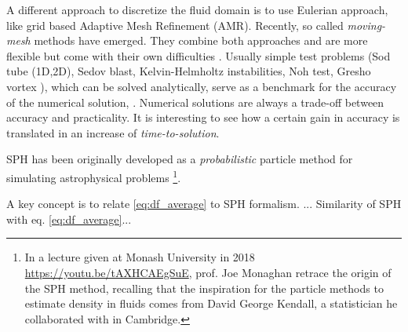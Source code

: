 A different approach to discretize the fluid domain is to use Eulerian approach, like grid based Adaptive Mesh Refinement (AMR).
Recently, so called \emph{moving-mesh} methods have emerged. They combine both approaches and are more flexible but come with their own difficulties \citep{Springel2010, Shadowfax, Arepo}.
Usually simple test problems (Sod tube (1D,2D), Sedov blast, Kelvin-Helmholtz instabilities, Noh test, Gresho vortex \citet{Gresho1990}), %
which can be solved analytically, serve as a benchmark for the accuracy of the numerical solution, \citep[e.g. by measuring the distance of the two solution with an L2-norm in the whole domain, ][]{BorrowSphenix}.
Numerical solutions are always a trade-off between accuracy and practicality.
It is interesting to see how a certain gain in accuracy is translated in an increase of \emph{time-to-solution}.

SPH has been originally developed as a \emph{probabilistic} particle method for simulating astrophysical problems \citep{Lucy1977, Gingold1977}\footnote{In a lecture given at Monash University in 2018 \url{https://youtu.be/tAXHCAEgSuE}, prof. Joe Monaghan retrace the origin of the SPH method, recalling that the inspiration for the particle methods to estimate density in fluids comes from David George Kendall, a statistician he collaborated with in Cambridge.}.

A key concept is to relate \eqref{eq:df_average} to SPH formalism.
... Similarity of SPH with eq. \eqref{eq:df_average}...





